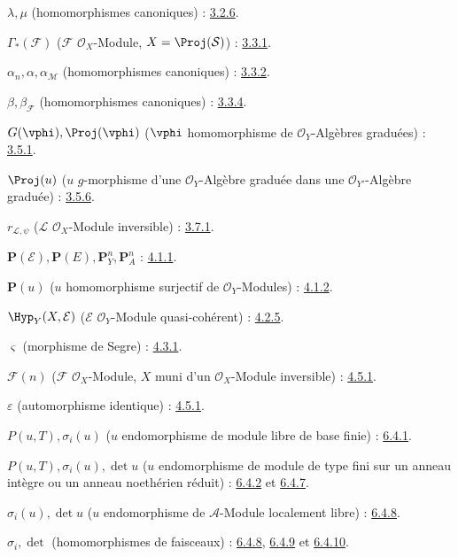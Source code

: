 $\lambda,\mu$ (homomorphismes canoniques) : \hyperref[II.3.2.6-fr]{3.2.6}.

$\Gamma_*(\mathcal{F})$ ($\mathcal{F}$ $\mathcal{O}_X$-Module,
$X=\Proj(\mathcal{S})$) : \hyperref[II.3.3.1-fr]{3.3.1}.

$\alpha_n,\alpha,\alpha_{\mathcal{M}}$ (homomorphismes canoniques) : \hyperref[II.3.3.2-fr]{3.3.2}.

$\beta,\beta_{\mathcal{F}}$ (homomorphismes canoniques) : \hyperref[II.3.3.4-fr]{3.3.4}.

$G(\vphi),\Proj(\vphi)$
($\vphi$ homomorphisme de $\mathcal{O}_Y$-Algèbres graduées) : \hyperref[II.3.5.1-fr]{3.5.1}.

$\Proj(u)$ ($u$ $g$-morphisme d'une $\mathcal{O}_Y$-Algèbre graduée
dans une $\mathcal{O}_{Y'}$-Algèbre graduée) : \hyperref[II.3.5.6-fr]{3.5.6}.

$r_{\mathcal{L},\psi}$ ($\mathcal{L}$ $\mathcal{O}_X$-Module inversible) : \hyperref[II.3.7.1-fr]{3.7.1}.

$\mathbf{P}(\mathcal{E}),\mathbf{P}(E),\mathbf{P}_Y^n,\mathbf{P}_A^n$ : \hyperref[II.4.1.1-fr]{4.1.1}.

$\mathbf{P}(u)$ ($u$ homomorphisme surjectif de $\mathcal{O}_Y$-Modules) : \hyperref[II.4.1.2-fr]{4.1.2}.

$\Hyp_Y(X,\mathcal{E})$ ($\mathcal{E}$ $\mathcal{O}_Y$-Module quasi-cohérent) : \hyperref[II.4.2.5-fr]{4.2.5}.

$\varsigma$ (morphisme de Segre) : \hyperref[II.4.3.1-fr]{4.3.1}.

$\mathcal{F}(n)$ ($\mathcal{F}$ $\mathcal{O}_X$-Module, $X$ muni d'un
$\mathcal{O}_X$-Module inversible) : \hyperref[II.4.5.1-fr]{4.5.1}.

$\varepsilon$ (automorphisme identique) : \hyperref[II.4.5.1-fr]{4.5.1}.

$P(u,T),\sigma_i(u)$ ($u$ endomorphisme de module libre de base finie) : \hyperref[II.6.4.1-fr]{6.4.1}.

$P(u,T),\sigma_i(u),\det u$
($u$ endomorphisme de module de type fini sur un anneau intègre ou un
anneau noethérien réduit) : \hyperref[II.6.4.2-fr]{6.4.2} et \hyperref[II.6.4.7-fr]{6.4.7}.

$\sigma_i(u),\det u$ ($u$ endomorphisme de $\mathcal{A}$-Module localement libre) : \hyperref[II.6.4.8-fr]{6.4.8}.

$\sigma_i,\det$ (homomorphismes de faisceaux) : \hyperref[II.6.4.8-fr]{6.4.8}, \hyperref[II.6.4.9-fr]{6.4.9} et \hyperref[II.6.4.10-fr]{6.4.10}.

